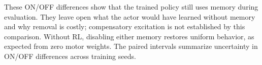 These ON/OFF differences show that the trained policy still uses memory during evaluation. They leave open what the actor would have learned without memory and why removal is costly; compensatory excitation is not established by this comparison. Without RL, disabling either memory restores uniform behavior, as expected from zero motor weights. The paired intervals summarize uncertainty in ON/OFF differences across training seeds.

